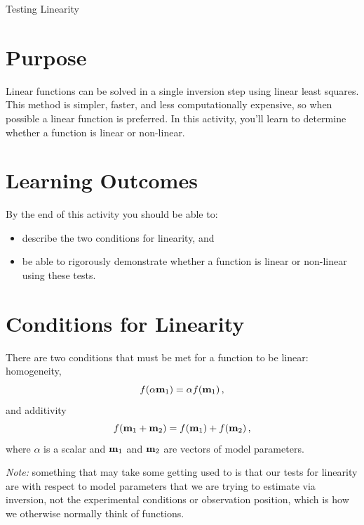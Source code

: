 \begin{activity}{Testing Linearity}

\section*{Purpose}

Linear functions can be solved in a single inversion step using linear least squares.  This method is simpler, faster, and less computationally expensive, so when possible a linear function is preferred.  In this activity, you'll learn to determine whether a function is linear or non-linear.

\section*{Learning Outcomes}

By the end of this activity you should be able to:
\begin{itemize}
    \item describe the two conditions for linearity, and
    \item be able to rigorously demonstrate whether a function is linear or non-linear using these tests.
\end{itemize}

\section*{Conditions for Linearity}

There are two conditions that must be met for a function to be linear: homogeneity,
\[
    f(\alpha \vb{m}_1) = \alpha f(\vb{m}_1) \, ,
\]
and additivity
\[
    f(\vb{m}_1 + \vb{m}_2) = f(\vb{m}_1) + f(\vb{m}_2) \, ,
\]
where $\alpha$ is a scalar and $\vb{m}_1$ and $\vb{m}_2$ are vectors of model parameters.

\emph{Note:} something that may take some getting used to is that our tests for linearity are with respect to model parameters that we are trying to estimate via inversion, not the experimental conditions or observation position, which is how we otherwise normally think of functions.

\end{activity}
